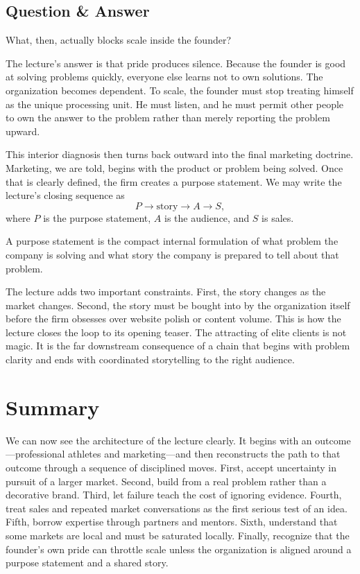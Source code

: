 \subsection{Question \& Answer}

What, then, actually blocks scale inside the founder?

The lecture's answer is that pride produces silence. Because the founder is good at solving problems quickly, everyone else learns not to own solutions. The organization becomes dependent. To scale, the founder must stop treating himself as the unique processing unit. He must listen, and he must permit other people to own the answer to the problem rather than merely reporting the problem upward.

This interior diagnosis then turns back outward into the final marketing doctrine. Marketing, we are told, begins with the product or problem being solved. Once that is clearly defined, the firm creates a purpose statement. We may write the lecture's closing sequence as
\begin{equation}
P
\longrightarrow
\text{story}
\longrightarrow
A
\longrightarrow
S,
\end{equation}
where $P$ is the purpose statement, $A$ is the audience, and $S$ is sales.

\begin{definition}
A purpose statement is the compact internal formulation of what problem the company is solving and what story the company is prepared to tell about that problem.
\end{definition}

The lecture adds two important constraints. First, the story changes as the market changes. Second, the story must be bought into by the organization itself before the firm obsesses over website polish or content volume. This is how the lecture closes the loop to its opening teaser. The attracting of elite clients is not magic. It is the far downstream consequence of a chain that begins with problem clarity and ends with coordinated storytelling to the right audience.

\section{Summary}

We can now see the architecture of the lecture clearly. It begins with an outcome---professional athletes and marketing---and then reconstructs the path to that outcome through a sequence of disciplined moves. First, accept uncertainty in pursuit of a larger market. Second, build from a real problem rather than a decorative brand. Third, let failure teach the cost of ignoring evidence. Fourth, treat sales and repeated market conversations as the first serious test of an idea. Fifth, borrow expertise through partners and mentors. Sixth, understand that some markets are local and must be saturated locally. Finally, recognize that the founder's own pride can throttle scale unless the organization is aligned around a purpose statement and a shared story.

